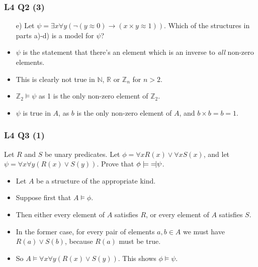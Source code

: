 \documentclass[handout]{beamer}
\newcommand{\bN}{\mathbb{N}}
\newcommand{\bZ}{\mathbb{Z}}
\newcommand{\bR}{\mathbb{R}}
\newcommand{\lequiv}{\models\text{\reflectbox{$\models$}}}
\begin{document}
\begin{frame}
\frametitle{L4 Q2 (3)}
\begin{enumerate}[]
\item[e)] Let $\psi= \exists x \forall y(\neg (y\approx 0)\rightarrow (x\times y \approx 1))$. Which of the structures in parts a)-d) is a model for $\psi$? 
\end{enumerate} 
\vspace{0.5cm}
\begin{itemize}
\item $\psi$ is the statement that there's an element which is an inverse to \emph{all} non-zero elements.\vspace{0.3cm}
\item This is clearly not true in $\bN$, $\bR$ or $\bZ_n$ for $n>2$.\vspace{0.3cm}
\item $\bZ_2\models \psi$ as 1 is the only non-zero element of $\bZ_2$.\vspace{0.3cm}
\item $\psi$ is true in $A$, as $b$ is the only non-zero element of $A$, and $b\times b = b = 1$.
\end{itemize}
\end{frame}

\begin{frame}
\frametitle{L4 Q3 (1)}
Let $R$ and $S$ be unary predicates. Let $\phi=\forall x R(x) \vee \forall x S(x)$, and let $\psi=\forall x \forall y (R(x)\vee S(y))$. Prove that $\phi\lequiv \psi$.
\vspace{0.5cm}
\begin{itemize}
\item Let $A$ be a structure of the appropriate kind. \vspace{0.2cm}
\item Suppose first that $A\models \phi$. \vspace{0.2cm}
\item Then either every element of $A$ satisfies $R$, or every element of $A$ satisfies $S$. \vspace{0.2cm}
\item In the former case, for every pair of elements $a,b\in A$ we must have $R(a)\vee S(b)$, because $R(a)$ must be true. \vspace{0.2cm}
\item So $A\models \forall x\forall y(R(x)\vee S(y))$. This shows $\phi\models \psi$.
\end{itemize}
\end{frame}
\end{document}
